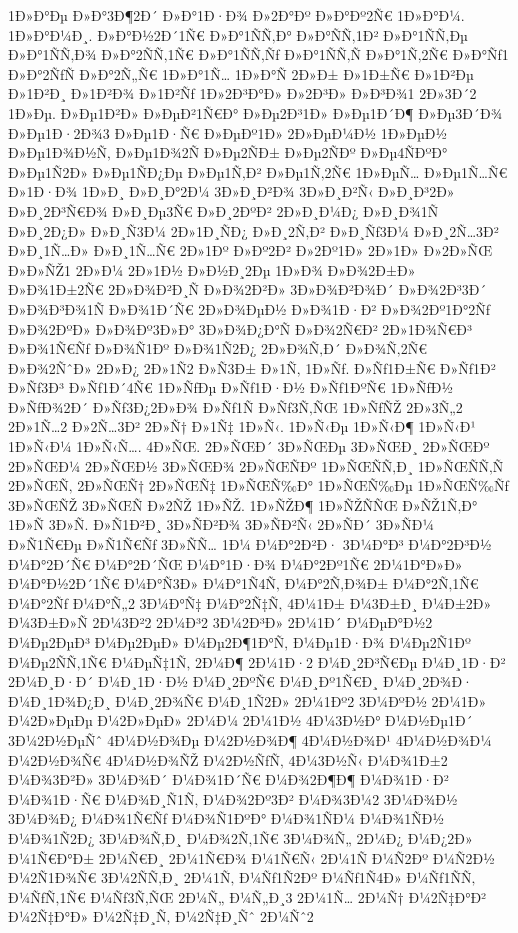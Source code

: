 {1Ð»Ð°Ðµ
Ð»Ð°3Ð¶2Ð´
Ð»Ð°1Ð·Ð¾
Ð»2Ð°Ðº
Ð»Ð°Ðº2Ñ€
1Ð»Ð°Ð¼.
1Ð»Ð°Ð¼Ð¸.
Ð»Ð°Ð½2Ð´1Ñ€
Ð»Ð°1ÑÑ‚Ð°
Ð»Ð°ÑÑ‚1Ð²
Ð»Ð°1ÑÑ‚Ðµ
Ð»Ð°1ÑÑ‚Ð¾
Ð»Ð°2ÑÑ‚1Ñ€
Ð»Ð°1ÑÑ‚Ñƒ
Ð»Ð°1ÑÑ‚Ñ
Ð»Ð°1Ñ‚2Ñ€
Ð»Ð°Ñƒ1
Ð»Ð°2ÑƒÑ
Ð»Ð°2Ñ„Ñ€
1Ð»Ð°1Ñ…
1Ð»Ð°Ñ
2Ð»Ð±
Ð»1Ð±Ñ€
Ð»1Ð²Ðµ
Ð»1Ð²Ð¸
Ð»1Ð²Ð¾
Ð»1Ð²Ñƒ
1Ð»2Ð³Ð°Ð»
Ð»2Ð³Ð»
Ð»Ð³Ð¾1
2Ð»3Ð´2
1Ð»Ðµ.
Ð»Ðµ1Ð²Ð»
Ð»ÐµÐ²1Ñ€Ð°
Ð»Ðµ2Ð³1Ð»
Ð»Ðµ1Ð´Ð¶
Ð»Ðµ3Ð´Ð¾
Ð»Ðµ1Ð·2Ð¾3
Ð»Ðµ1Ð·Ñ€
Ð»ÐµÐº1Ð»
2Ð»ÐµÐ¼Ð½
1Ð»ÐµÐ½
Ð»Ðµ1Ð¾Ð½Ñ‚
Ð»Ðµ1Ð¾2Ñ
Ð»Ðµ2ÑÐ±
Ð»Ðµ2ÑÐº
Ð»Ðµ4ÑÐºÐ°
Ð»Ðµ1Ñ2Ð»
Ð»Ðµ1ÑÐ¿Ðµ
Ð»Ðµ1Ñ‚Ð²
Ð»Ðµ1Ñ‚2Ñ€
1Ð»ÐµÑ…
Ð»Ðµ1Ñ…Ñ€
Ð»1Ð·Ð¾
1Ð»Ð¸
Ð»Ð¸Ð°2Ð¼
3Ð»Ð¸Ð²Ð¾
3Ð»Ð¸Ð²Ñ‹
Ð»Ð¸Ð³2Ð»
Ð»Ð¸2Ð³Ñ€Ð¾
Ð»Ð¸Ðµ3Ñ€
Ð»Ð¸2ÐºÐ²
2Ð»Ð¸Ð¼Ð¿
Ð»Ð¸Ð¾1Ñ
Ð»Ð¸2Ð¿Ð»
Ð»Ð¸Ñ3Ð¼
2Ð»1Ð¸ÑÐ¿
Ð»Ð¸2Ñ‚Ð²
Ð»Ð¸Ñƒ3Ð¼
Ð»Ð¸2Ñ…3Ð²
Ð»Ð¸1Ñ…Ð»
Ð»Ð¸1Ñ…Ñ€
2Ð»1Ðº
Ð»Ðº2Ð²
Ð»2Ðº1Ð»
2Ð»1Ð»
Ð»2Ð»ÑŒ
Ð»Ð»ÑŽ1
2Ð»Ð¼
2Ð»1Ð½
Ð»Ð½Ð¸2Ðµ
1Ð»Ð¾
Ð»Ð¾2Ð±Ð»
Ð»Ð¾1Ð±2Ñ€
2Ð»Ð¾Ð²Ð¸Ñ
Ð»Ð¾2Ð²Ð»
3Ð»Ð¾Ð²Ð¾Ð´
Ð»Ð¾2Ð³3Ð´
Ð»Ð¾Ð³Ð¾1Ñ
Ð»Ð¾1Ð´Ñ€
2Ð»Ð¾ÐµÐ½
Ð»Ð¾1Ð·Ð²
Ð»Ð¾2Ðº1Ð°2Ñƒ
Ð»Ð¾2ÐºÐ»
Ð»Ð¾Ðº3Ð»Ð°
3Ð»Ð¾Ð¿Ð°Ñ
Ð»Ð¾2Ñ€Ð²
2Ð»1Ð¾Ñ€Ð³
Ð»Ð¾1Ñ€Ñƒ
Ð»Ð¾Ñ1Ðº
Ð»Ð¾1Ñ2Ð¿
2Ð»Ð¾Ñ‚Ð´
Ð»Ð¾Ñ‚2Ñ€
Ð»Ð¾2ÑˆÐ»
2Ð»Ð¿
2Ð»1Ñ2
Ð»Ñ3Ð±
Ð»1Ñ‚
1Ð»Ñƒ.
Ð»Ñƒ1Ð±Ñ€
Ð»Ñƒ1Ð²
Ð»Ñƒ3Ð³
Ð»Ñƒ1Ð´4Ñ€
1Ð»ÑƒÐµ
Ð»Ñƒ1Ð·Ð½
Ð»Ñƒ1ÐºÑ€
1Ð»ÑƒÐ½
Ð»ÑƒÐ¾2Ð´
Ð»Ñƒ3Ð¿2Ð»Ð¾
Ð»Ñƒ1Ñ
Ð»Ñƒ3Ñ‚ÑŒ
1Ð»ÑƒÑŽ
2Ð»3Ñ„2
2Ð»1Ñ…2
Ð»2Ñ…3Ð²
2Ð»Ñ†
Ð»1Ñ‡
1Ð»Ñ‹.
1Ð»Ñ‹Ðµ
1Ð»Ñ‹Ð¶
1Ð»Ñ‹Ð¹
1Ð»Ñ‹Ð¼
1Ð»Ñ‹Ñ….
4Ð»ÑŒ.
2Ð»ÑŒÐ´
3Ð»ÑŒÐµ
3Ð»ÑŒÐ¸
2Ð»ÑŒÐº
2Ð»ÑŒÐ¼
2Ð»ÑŒÐ½
3Ð»ÑŒÐ¾
2Ð»ÑŒÑÐº
1Ð»ÑŒÑÑ‚Ð¸
1Ð»ÑŒÑÑ‚Ñ
2Ð»ÑŒÑ‚
2Ð»ÑŒÑ†
2Ð»ÑŒÑ‡
1Ð»ÑŒÑ‰Ð°
1Ð»ÑŒÑ‰Ðµ
1Ð»ÑŒÑ‰Ñƒ
3Ð»ÑŒÑŽ
3Ð»ÑŒÑ
Ð»2ÑŽ
1Ð»ÑŽ.
1Ð»ÑŽÐ¶
1Ð»ÑŽÑÑŒ
Ð»ÑŽ1Ñ‚Ð°
1Ð»Ñ
3Ð»Ñ.
Ð»Ñ1Ð²Ð¸
3Ð»ÑÐ²Ð¾
3Ð»ÑÐ²Ñ‹
2Ð»ÑÐ´
3Ð»ÑÐ¼
Ð»Ñ1Ñ€Ðµ
Ð»Ñ1Ñ€Ñƒ
3Ð»ÑÑ…
1Ð¼
Ð¼Ð°2Ð²Ð·
3Ð¼Ð°Ð³
Ð¼Ð°2Ð³Ð½
Ð¼Ð°2Ð´Ñ€
Ð¼Ð°2Ð´ÑŒ
Ð¼Ð°1Ð·Ð¾
Ð¼Ð°2Ðº1Ñ€
2Ð¼1Ð°Ð»Ð»
Ð¼Ð°Ð½2Ð´1Ñ€
Ð¼Ð°Ñ3Ð»
Ð¼Ð°1Ñ4Ñ‚
Ð¼Ð°2Ñ‚Ð¾Ð±
Ð¼Ð°2Ñ‚1Ñ€
Ð¼Ð°2Ñƒ
Ð¼Ð°Ñ„2
3Ð¼Ð°Ñ‡
Ð¼Ð°2Ñ‡Ñ‚
4Ð¼1Ð±
Ð¼3Ð±Ð¸
Ð¼Ð±2Ð»
Ð¼3Ð±Ð»Ñ
2Ð¼3Ð²2
2Ð¼Ð³2
3Ð¼2Ð³Ð»
2Ð¼1Ð´
Ð¼ÐµÐ°Ð½2
Ð¼Ðµ2ÐµÐ³
Ð¼Ðµ2ÐµÐ»
Ð¼Ðµ2Ð¶1Ð°Ñ‚
Ð¼Ðµ1Ð·Ð¾
Ð¼Ðµ2Ñ1Ðº
Ð¼Ðµ2ÑÑ‚1Ñ€
Ð¼ÐµÑ‡1Ñ‚
2Ð¼Ð¶
2Ð¼1Ð·2
Ð¼Ð¸2Ð³Ñ€Ðµ
Ð¼Ð¸1Ð·Ð²
2Ð¼Ð¸Ð·Ð´
Ð¼Ð¸1Ð·Ð½
Ð¼Ð¸2ÐºÑ€
Ð¼Ð¸Ðº1Ñ€Ð¸
Ð¼Ð¸2Ð¾Ð·
Ð¼Ð¸1Ð¾Ð¿Ð¸
Ð¼Ð¸2Ð¾Ñ€
Ð¼Ð¸1Ñ2Ð»
2Ð¼1Ðº2
3Ð¼ÐºÐ½
2Ð¼1Ð»
Ð¼2Ð»ÐµÐµ
Ð¼2Ð»ÐµÐ»
2Ð¼Ð¼
2Ð¼1Ð½
4Ð¼3Ð½Ð°
Ð¼Ð½Ðµ1Ð´
3Ð¼2Ð½ÐµÑˆ
4Ð¼Ð½Ð¾Ðµ
Ð¼2Ð½Ð¾Ð¶
4Ð¼Ð½Ð¾Ð¹
4Ð¼Ð½Ð¾Ð¼
Ð¼2Ð½Ð¾Ñ€
4Ð¼Ð½Ð¾ÑŽ
Ð¼2Ð½ÑƒÑ‚
4Ð¼3Ð½Ñ‹
Ð¼Ð¾1Ð±2
Ð¼Ð¾3Ð²Ð»
3Ð¼Ð¾Ð´
Ð¼Ð¾1Ð´Ñ€
Ð¼Ð¾2Ð¶Ð¶
Ð¼Ð¾1Ð·Ð²
Ð¼Ð¾1Ð·Ñ€
Ð¼Ð¾Ð¸Ñ1Ñ‚
Ð¼Ð¾2Ðº3Ð²
Ð¼Ð¾3Ð¼2
3Ð¼Ð¾Ð½
3Ð¼Ð¾Ð¿
Ð¼Ð¾1Ñ€Ñƒ
Ð¼Ð¾Ñ1ÐºÐ°
Ð¼Ð¾1ÑÐ¼
Ð¼Ð¾1ÑÐ½
Ð¼Ð¾1Ñ2Ð¿
3Ð¼Ð¾Ñ‚Ð¸
Ð¼Ð¾2Ñ‚1Ñ€
3Ð¼Ð¾Ñ„
2Ð¼Ð¿
Ð¼Ð¿2Ð»
Ð¼1Ñ€Ð°Ð±
2Ð¼Ñ€Ð¸
2Ð¼1Ñ€Ð¾
Ð¼1Ñ€Ñ‹
2Ð¼1Ñ
Ð¼Ñ2Ðº
Ð¼Ñ2Ð½
Ð¼2Ñ1Ð¾Ñ€
3Ð¼2ÑÑ‚Ð¸
2Ð¼1Ñ‚
Ð¼Ñƒ1Ñ2Ðº
Ð¼Ñƒ1Ñ4Ð»
Ð¼Ñƒ1ÑÑ‚
Ð¼ÑƒÑ‚1Ñ€
Ð¼Ñƒ3Ñ‚ÑŒ
2Ð¼Ñ„
Ð¼Ñ„Ð¸3
2Ð¼1Ñ…
2Ð¼Ñ†
Ð¼2Ñ‡Ð°Ð²
Ð¼2Ñ‡Ð°Ð»
Ð¼2Ñ‡Ð¸Ñ‚
Ð¼2Ñ‡Ð¸Ñˆ
2Ð¼Ñˆ2
}
